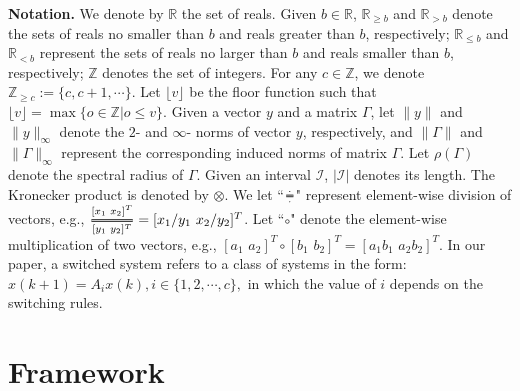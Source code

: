 \documentclass{autart}
\newcommand{\efrac}[2]{%
	\mathchoice
	{\ooalign{%
			$\genfrac{}{}{1.8pt}0{\hphantom{#1}}{\hphantom{#2}}$\cr%
			$\color{white}\genfrac{}{}{.6pt}0{\color{black}#1}{\color{black}#2}$}}%
	{\ooalign{%
			$\genfrac{}{}{1.8pt}1{\hphantom{#1}}{\hphantom{#2}}$\cr%
			$\color{white}\genfrac{}{}{.6pt}1{\color{black}#1}{\color{black}#2}$}}%
	{\ooalign{%
			$\genfrac{}{}{1.8pt}2{\hphantom{#1}}{\hphantom{#2}}$\cr%
			$\color{white}\genfrac{}{}{.6pt}2{\color{black}#1}{\color{black}#2}$}}%
	{\ooalign{%
			$\genfrac{}{}{1.8pt}3{\hphantom{#1}}{\hphantom{#2}}$\cr%
			$\color{white}\genfrac{}{}{.6pt}3{\color{black}#1}{\color{black}#2}$}}%
}
\newcommand{\Efrac}[2]{%
	\mathchoice
	{\ooalign{%
			$\genfrac{}{}{1.8pt}0{#1}{#2}$\cr%
			$\color{white}\genfrac{}{}{.6pt}0{\phantom{#1}}{\phantom{#2}}$}}%
	{\ooalign{%
			$\genfrac{}{}{1.8pt}1{#1}{#2}$\cr%
			$\color{white}\genfrac{}{}{.6pt}1{\phantom{#1}}{\phantom{#2}}$}}%
	{\ooalign{%
			$\genfrac{}{}{1.8pt}2{#1}{#2}$\cr%
			$\color{white}\genfrac{}{}{.6pt}2{\phantom{#1}}{\phantom{#2}}$}}%
	{\ooalign{%
			$\genfrac{}{}{1.8pt}3{#1}{#2}$\cr%
			$\color{white}\genfrac{}{}{.6pt}3{\phantom{#1}}{\phantom{#2}}$}}%
}
\begin{document}
\textbf{Notation.} We denote by  $\mathbb R$ the set of reals. Given $b \in \mathbb R$, $\mathbb R_{\geq b}$ and $\mathbb R_{>b}$ denote the sets of reals no smaller than $b$ and reals greater than $b$, respectively; $\mathbb R_{\le b}$ and $\mathbb R_{<b}$ represent the sets of reals no larger than $b$ and reals smaller than $b$, respectively; $\mathbb Z$ denotes the set of integers. For any $c \in \mathbb Z$, we denote $\mathbb Z_{\ge c} := \{c,c+ 1,\cdots\}$. Let $\lfloor v \rfloor$ be the floor function such that $\lfloor v \rfloor= \max\{o\in \mathbb{Z}|o\le v\}$. 
Given a vector $y$ and a matrix $\Gamma$, let $\|y\|$ and $\|y\|_\infty$ denote the $2 $- and $\infty$- norms of vector $y$, respectively, and $\|\Gamma\|$ and $\|\Gamma\|_\infty$ represent the corresponding induced norms of matrix $\Gamma$. Let $\rho(\Gamma)$ denote the spectral radius of $\Gamma$. Given an interval $\mathcal{I}$, $|\mathcal{I}|$ denotes its length. The Kronecker product is denoted by $\otimes$. We let ``$\efrac{\,\cdot\,}{\,\cdot\,}$" represent element-wise division of vectors, e.g., $\Efrac{[x_1\,\, x_2]^T}{[y_1\,\, y_2]^T}=[x_1/y_1 \,\, x_2/y_2]^T$. 
Let ``$\circ$" denote the element-wise multiplication of two vectors, e.g., $[a_1\,\,a_2]^T \circ [b_1\,\,b_2]^T =[a_1b_1\,\, a_2 b_2]^T$.
In our paper, a switched system refers to a class of systems in the form:
$
	x(k+1)= A_i x(k), i \in \{1, 2, \cdots, c\}, 
$
in which the value of $i$ depends on the switching rules. 


\section{Framework}
\end{document}
